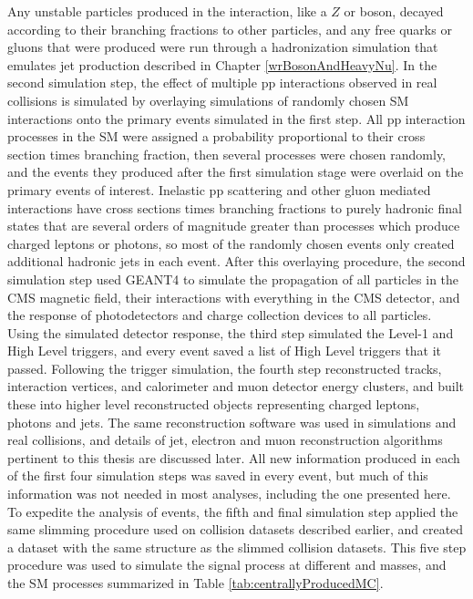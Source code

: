 Any unstable particles produced in the interaction, like a $Z$ or \WR boson, decayed according to 
their branching fractions to other particles, and any free quarks or gluons that were produced were 
run through a hadronization simulation that emulates jet production described in Chapter \ref{wrBosonAndHeavyNu}.  In the second 
simulation step, the effect of multiple pp interactions observed in real collisions is simulated by 
overlaying simulations of randomly chosen SM interactions onto the primary events simulated in the first 
step.  All pp interaction processes in the SM were assigned a probability proportional to their cross section 
times branching fraction, then several processes were chosen randomly, and the events they produced after 
the first simulation stage were overlaid on the primary events of interest.  Inelastic pp scattering and 
other gluon mediated interactions have cross sections times branching fractions to purely hadronic 
final states that are several orders of magnitude greater than processes which produce charged leptons 
or photons, so most of the randomly chosen events only created additional hadronic jets in each event.  After 
this overlaying procedure, the second simulation step used GEANT4 \cite{geant4} to simulate the propagation of all particles in 
the CMS magnetic field, their interactions with everything in the CMS detector, and the response of 
photodetectors and charge collection devices to all particles.  Using the simulated detector response, 
the third step simulated the Level-1 and High Level triggers, and every event saved a list of High 
Level triggers that it passed.  Following the trigger simulation, the fourth step reconstructed tracks, 
interaction vertices, and calorimeter and muon detector energy clusters, and built these into higher level 
reconstructed objects representing charged leptons, photons and jets.  The same reconstruction software 
was used in simulations and real collisions, and details of jet, electron and muon reconstruction 
algorithms pertinent to this thesis are discussed later.  All new information produced in each of the first 
four simulation steps was saved in every event, but much of this information was not needed in most 
analyses, including the one presented here.  To expedite the analysis of \MC events, the fifth and final 
simulation step applied the same slimming procedure used on collision datasets described earlier, and 
created a \MC dataset with the same structure as the slimmed collision datasets.  This five step procedure 
was used to simulate the \WR signal process at different \mWR and \mnul masses, and the SM processes 
summarized in Table \ref{tab:centrallyProducedMC}.


